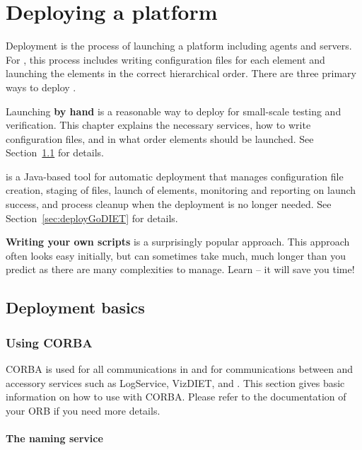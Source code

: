 \chapter{Deploying a \diet platform}
\label{ch:deploying}

Deployment is the process of launching a \diet platform including agents
and servers.  For \diet, this process includes writing configuration
files for each element and launching the elements in the correct
hierarchical order. There are three primary ways to deploy \diet.

Launching \textbf{by hand} is a reasonable way to deploy \diet for
small-scale testing and verification. This chapter explains the 
necessary services, how to write \diet configuration files, and in
what order \diet elements should be launched.  See
Section~\ref{sec:deployBasics} for details.

\textbf{\godiet} is a Java-based tool for automatic \diet deployment
that manages configuration file creation, staging of files, launch
of elements, monitoring and reporting on launch success, and process
cleanup when the \diet deployment is no longer needed.   See 
Section~\ref{sec:deployGoDIET} for details.

\textbf{Writing your own scripts} is a surprisingly popular
approach.  This approach often looks easy initially, but can
sometimes take much, much longer than you predict as there are many
complexities to manage.  Learn \godiet -- it will save you time!



\section{Deployment basics}
\label{sec:deployBasics}

\subsection{Using CORBA} 
\label{sec:CORBA_services}

CORBA is used for all communications in \diet and for communications
between \diet and accessory services such as LogService, VizDIET, and
\godiet.  This section gives basic information on how to use \diet
with CORBA.  Please refer to the documentation of your ORB if you
need more details.

\subsubsection{The naming service}

